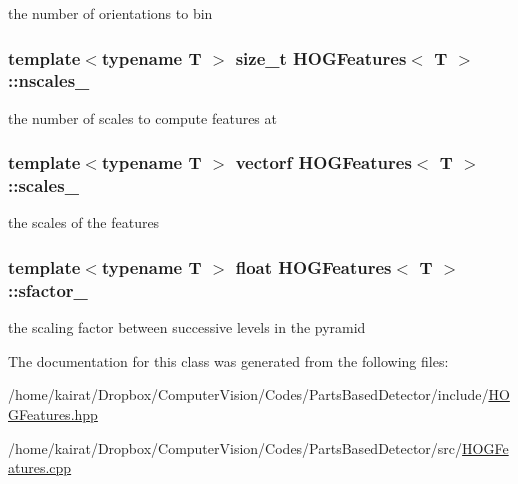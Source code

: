 the number of orientations to bin 

\hypertarget{classHOGFeatures_a46cde43950d00f33de7d11cd8a8da5bf}{}
\subsubsection[{nscales\+\_\+}]{\setlength{\rightskip}{0pt plus 5cm}template$<$typename T $>$ size\+\_\+t {\bf H\+O\+G\+Features}$<$ T $>$\+::nscales\+\_\+\hspace{0.3cm}{\ttfamily [private]}}\label{classHOGFeatures_a46cde43950d00f33de7d11cd8a8da5bf}


the number of scales to compute features at 

\hypertarget{classHOGFeatures_a27490a8c33c7ffbfdeedafc5af0ad544}{}
\subsubsection[{scales\+\_\+}]{\setlength{\rightskip}{0pt plus 5cm}template$<$typename T $>$ {\bf vectorf} {\bf H\+O\+G\+Features}$<$ T $>$\+::scales\+\_\+\hspace{0.3cm}{\ttfamily [private]}}\label{classHOGFeatures_a27490a8c33c7ffbfdeedafc5af0ad544}


the scales of the features 

\hypertarget{classHOGFeatures_a45b232ca94e93b4f30d342374e62578f}{}
\subsubsection[{sfactor\+\_\+}]{\setlength{\rightskip}{0pt plus 5cm}template$<$typename T $>$ float {\bf H\+O\+G\+Features}$<$ T $>$\+::sfactor\+\_\+\hspace{0.3cm}{\ttfamily [private]}}\label{classHOGFeatures_a45b232ca94e93b4f30d342374e62578f}


the scaling factor between successive levels in the pyramid 



The documentation for this class was generated from the following files\+:\begin{DoxyCompactItemize}
\item 
/home/kairat/\+Dropbox/\+Computer\+Vision/\+Codes/\+Parts\+Based\+Detector/include/\hyperlink{HOGFeatures_8hpp}{H\+O\+G\+Features.\+hpp}\item 
/home/kairat/\+Dropbox/\+Computer\+Vision/\+Codes/\+Parts\+Based\+Detector/src/\hyperlink{HOGFeatures_8cpp}{H\+O\+G\+Features.\+cpp}\end{DoxyCompactItemize}

